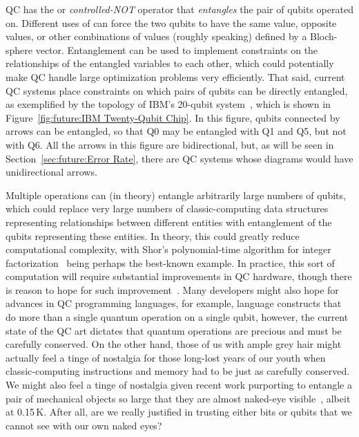 QC has the  or \emph{controlled-NOT} operator that
\emph{entangles} the pair of qubits operated on.
Different uses of  can force the two qubits to have the same
value, opposite values, or other combinations of values (roughly speaking)
defined by a Bloch-sphere vector.
Entanglement can be used to implement constraints
on the relationships of the entangled variables to each other, which
could potentially make QC handle large optimization problems very
efficiently.
That said, current QC systems place constraints on which pairs of
qubits can be directly entangled, as exemplified by the topology
of IBM's 20-qubit system~\cite{IBMResearch2018QCsystems}, which is shown in
Figure~\ref{fig:future:IBM Twenty-Qubit Chip}.
In this figure, qubits connected by arrows can be entangled, so that
Q0 may be entangled with Q1 and Q5, but not with Q6.
All the arrows in this figure are bidirectional, but, as will be seen in
Section~\ref{sec:future:Error Rate},
there are QC systems whose diagrams would have unidirectional arrows.

Multiple  operations can (in theory) entangle arbitrarily
large numbers of qubits, which could replace very large numbers of
classic-computing data structures representing relationships between
different entities with entanglement of the qubits
representing these entities.
In theory, this could greatly reduce computational complexity, with
Shor's polynomial-time algorithm for integer
factorization~\cite{Shor:1997:PAP:264393.264406}
being perhaps the best-known example.
In practice, this sort of computation will require substantial
improvements in QC hardware, though there is reason to hope
for such improvement~\cite{RobertMcConnell2015QC-Entangle3000Atoms}.
Many developers might also hope for advances in QC programming languages,
for example, language constructs that do more than a single quantum
operation on a single qubit, however, the current state of the
QC art dictates that quantum operations are precious and must
be carefully conserved.
On the other hand, those of us with ample grey hair might actually
feel a tinge of nostalgia for those long-lost years of our youth when
classic-computing instructions and memory had to be just as carefully
conserved.
We might also feel a tinge of nostalgia given recent work purporting
to entangle a pair of mechanical objects so large that they are almost
naked-eye visible~\cite{CFOckeloen-Korppi2017MassiveEntanglement},
albeit at 0.15\,K.
After all, are we really justified in trusting either bits or qubits
that we cannot see with our own naked eyes? \Winkey

